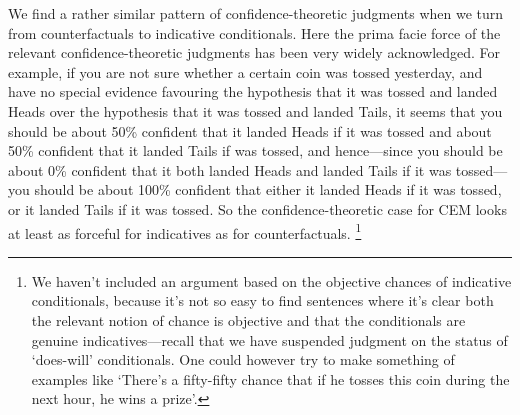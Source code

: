 \documentclass[leqno, 11pt, a5paper, openany]{article}
\begin{document}
We find a rather similar pattern of confidence-theoretic judgments when we turn from counterfactuals to indicative conditionals. Here the prima facie force of the relevant confidence-theoretic judgments has been very widely acknowledged. For example, if you are not sure whether a certain coin was tossed yesterday, and have no special evidence favouring the hypothesis that it was tossed and landed Heads over the hypothesis that it was tossed and landed Tails, it seems that you should be about 50\% confident that it landed Heads if it was tossed and about 50\% confident that it landed Tails if was tossed, and hence---since you should be about 0\% confident that it both landed Heads and landed Tails if it was tossed---you should be about 100\% confident that either it landed Heads if it was tossed, or it landed Tails if it was tossed. So the confidence-theoretic case for CEM looks at least as forceful for
indicatives as for counterfactuals.%
\footnote{We haven't included an argument based on the objective chances of indicative conditionals, because it's not so easy to find sentences where it's clear both the relevant notion of chance is objective and that the conditionals are genuine indicatives---recall that we have suspended judgment on the status of ‘does-will’ conditionals. One could however try to make something of examples like `There's a fifty-fifty chance that if he tosses this coin during the next hour, he wins a prize'.}
\end{document}
